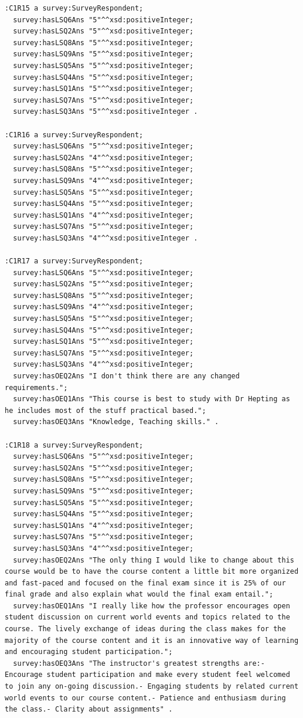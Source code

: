 \begin{lstlisting}
:C1R15 a survey:SurveyRespondent;
  survey:hasLSQ6Ans "5"^^xsd:positiveInteger;
  survey:hasLSQ2Ans "5"^^xsd:positiveInteger;
  survey:hasLSQ8Ans "5"^^xsd:positiveInteger;
  survey:hasLSQ9Ans "5"^^xsd:positiveInteger;
  survey:hasLSQ5Ans "5"^^xsd:positiveInteger;
  survey:hasLSQ4Ans "5"^^xsd:positiveInteger;
  survey:hasLSQ1Ans "5"^^xsd:positiveInteger;
  survey:hasLSQ7Ans "5"^^xsd:positiveInteger;
  survey:hasLSQ3Ans "5"^^xsd:positiveInteger .

:C1R16 a survey:SurveyRespondent;
  survey:hasLSQ6Ans "5"^^xsd:positiveInteger;
  survey:hasLSQ2Ans "4"^^xsd:positiveInteger;
  survey:hasLSQ8Ans "5"^^xsd:positiveInteger;
  survey:hasLSQ9Ans "4"^^xsd:positiveInteger;
  survey:hasLSQ5Ans "5"^^xsd:positiveInteger;
  survey:hasLSQ4Ans "5"^^xsd:positiveInteger;
  survey:hasLSQ1Ans "4"^^xsd:positiveInteger;
  survey:hasLSQ7Ans "5"^^xsd:positiveInteger;
  survey:hasLSQ3Ans "4"^^xsd:positiveInteger .

:C1R17 a survey:SurveyRespondent;
  survey:hasLSQ6Ans "5"^^xsd:positiveInteger;
  survey:hasLSQ2Ans "5"^^xsd:positiveInteger;
  survey:hasLSQ8Ans "5"^^xsd:positiveInteger;
  survey:hasLSQ9Ans "4"^^xsd:positiveInteger;
  survey:hasLSQ5Ans "5"^^xsd:positiveInteger;
  survey:hasLSQ4Ans "5"^^xsd:positiveInteger;
  survey:hasLSQ1Ans "5"^^xsd:positiveInteger;
  survey:hasLSQ7Ans "5"^^xsd:positiveInteger;
  survey:hasLSQ3Ans "4"^^xsd:positiveInteger;
  survey:hasOEQ2Ans "I don't think there are any changed requirements.";
  survey:hasOEQ1Ans "This course is best to study with Dr Hepting as he includes most of the stuff practical based.";
  survey:hasOEQ3Ans "Knowledge, Teaching skills." .

:C1R18 a survey:SurveyRespondent;
  survey:hasLSQ6Ans "5"^^xsd:positiveInteger;
  survey:hasLSQ2Ans "5"^^xsd:positiveInteger;
  survey:hasLSQ8Ans "5"^^xsd:positiveInteger;
  survey:hasLSQ9Ans "5"^^xsd:positiveInteger;
  survey:hasLSQ5Ans "5"^^xsd:positiveInteger;
  survey:hasLSQ4Ans "5"^^xsd:positiveInteger;
  survey:hasLSQ1Ans "4"^^xsd:positiveInteger;
  survey:hasLSQ7Ans "5"^^xsd:positiveInteger;
  survey:hasLSQ3Ans "4"^^xsd:positiveInteger;
  survey:hasOEQ2Ans "The only thing I would like to change about this course would be to have the course content a little bit more organized and fast-paced and focused on the final exam since it is 25% of our final grade and also explain what would the final exam entail.";
  survey:hasOEQ1Ans "I really like how the professor encourages open student discussion on current world events and topics related to the course. The lively exchange of ideas during the class makes for the majority of the course content and it is an innovative way of learning and encouraging student participation.";
  survey:hasOEQ3Ans "The instructor's greatest strengths are:- Encourage student participation and make every student feel welcomed to join any on-going discussion.- Engaging students by related current world events to our course content.- Patience and enthusiasm during the class.- Clarity about assignments" .


\end{lstlisting}
